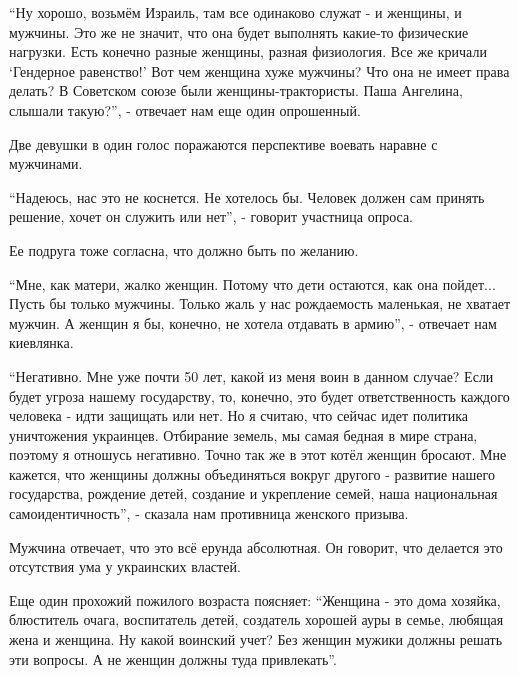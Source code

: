\begin{multicols}{2}
\enquote{Ну хорошо, возьмём Израиль, там все одинаково служат - и женщины, и мужчины.
Это же не значит, что она будет выполнять какие-то физические нагрузки. Есть
конечно разные женщины, разная физиология. Все же кричали \enquote{Гендерное
равенство!} Вот чем женщина хуже мужчины? Что она не имеет права делать? В
Советском союзе были женщины-трактористы. Паша Ангелина, слышали такую?}, -
отвечает нам еще один опрошенный.



Две девушки в один голос поражаются перспективе воевать наравне с мужчинами. 

\enquote{Надеюсь, нас это не коснется. Не хотелось бы. Человек должен сам принять
решение, хочет он служить или нет}, - говорит участница опроса.

Ее подруга тоже согласна, что должно быть по желанию.


\enquote{Мне, как матери, жалко женщин. Потому что дети остаются, как она пойдет...
Пусть бы только мужчины. Только жаль у нас рождаемость маленькая, не хватает
мужчин. А женщин я бы, конечно, не хотела отдавать в армию}, - отвечает нам
киевлянка.


\enquote{Негативно. Мне уже почти 50 лет, какой из меня воин в данном случае? Если
будет угроза нашему государству, то, конечно, это будет ответственность каждого
человека - идти защищать или нет. Но я считаю, что сейчас идет политика
уничтожения украинцев. Отбирание земель, мы самая бедная в мире страна, поэтому
я отношусь негативно. Точно так же в этот котёл женщин бросают. Мне кажется,
что женщины должны объединяться вокруг другого - развитие нашего государства,
рождение детей, создание и укрепление семей, наша национальная
самоидентичность}, - сказала нам противница женского призыва.


Мужчина отвечает, что это всё ерунда абсолютная. Он говорит, что делается это
отсутствия ума у украинских властей. 

Еще один прохожий пожилого возраста поясняет: \enquote{Женщина - это дома хозяйка,
блюститель очага, воспитатель детей, создатель хорошей ауры в семье, любящая
жена и женщина. Ну какой воинский учет? Без женщин мужики должны решать эти
вопросы. А не женщин должны туда привлекать}.


\end{multicols}
